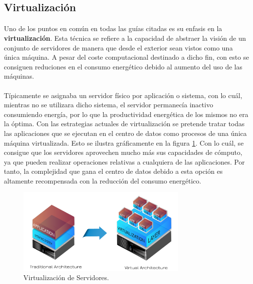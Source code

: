\documentclass[10pt]{article}
\begin{document}
		\subsection{Virtualización}

			\paragraph{}
			Uno de los puntos en común en todas las guías citadas es su enfasis en la \textbf{virtualización}. Esta técnica se refiere a la capacidad de abstraer la visión de un conjunto de servidores de manera que desde el exterior sean vistos como una única máquina. A pesar del coste computacional destinado a dicho fin, con esto se consiguen reduciones en el consumo energético debido al aumento del uso de las máquinas.

			\paragraph{}
			Típicamente se asignaba un servidor físico por aplicación o sistema, con lo cuál, mientras no se utilizara dicho sistema, el servidor permanecía inactivo consumiendo energía, por lo que la productividad energética de los mismos no era la óptima. Con las estrategias actuales de virtualización se pretende tratar todas las aplicaciones que se ejecutan en el centro de datos como procesos de una única máquina virtualizada. Esto se ilustra gráficamente en la figura \ref{image:virtualization}. Con lo cuál, se consigue que los servidores aprovechen mucho más sus capacidades de cómputo, ya que pueden realizar operaciones relativas a cualquiera de las aplicaciones. Por tanto, la complejidad que gana el centro de datos debido a esta opción es altamente recompensada con la reducción del consumo energético.


			\begin{figure}[htpb!]
				\begin{center}
					\includegraphics[width=0.75\textwidth]{virtualization}
					\caption{Virtualización de Servidores.\cite{exelos:virtualization}}
					\label{image:virtualization}
				\end{center}
			\end{figure}
\end{document}
